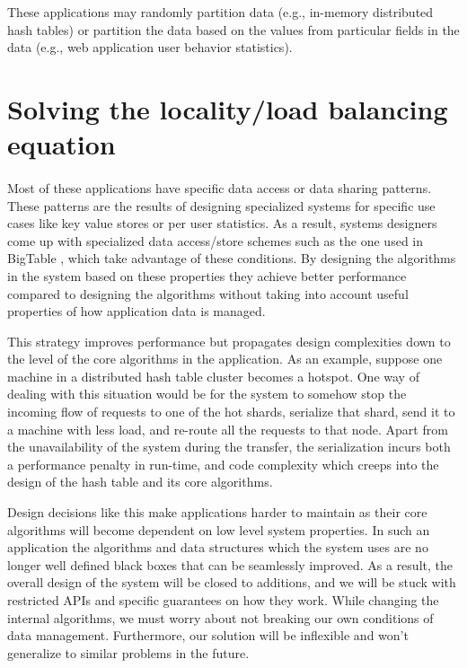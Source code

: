 These applications may randomly partition data (e.g., in-memory distributed
hash tables) or partition the data based on the values from particular fields
in the data (e.g., web application
user behavior statistics).


\section{Solving the locality/load balancing equation}
\paragraph{}
Most of these applications have specific data access or data sharing patterns.
These patterns are the results of designing specialized systems for specific
use cases like key value stores or per user statistics.
As a result, systems designers come up with specialized data access/store schemes
such as the one used in BigTable \cite{chang2008bigtable}, which take advantage of these conditions.
By designing the algorithms
in the system based on these properties they achieve better performance compared
to designing the algorithms without taking into account useful properties of
how application data is managed.

This strategy improves performance but propagates design complexities
down to the level of the core algorithms in the application. As an example, suppose
one machine in a distributed hash table cluster becomes a hotspot.
One way of dealing with this situation would be for the system to somehow stop
the incoming flow of requests to one of the hot shards, serialize that shard,
send it to a machine with less load, and re-route all the requests to that node.
Apart from the unavailability of the system during the transfer, the
serialization incurs both a performance penalty in run-time, and code complexity
which creeps into the design of the hash table and its core algorithms.

Design decisions like this make applications harder to maintain as their
core algorithms will become dependent on low level system properties.
In such an application the algorithms and data structures which the system uses
are no longer well defined black boxes that can be seamlessly improved. As a
result, the overall design of the system will be closed to additions, and we
will be stuck with restricted APIs and specific guarantees on how they work.
While changing the internal algorithms, we must worry about not breaking our own
conditions of data management. Furthermore, our solution will be inflexible and
won't generalize to similar problems in the future.


